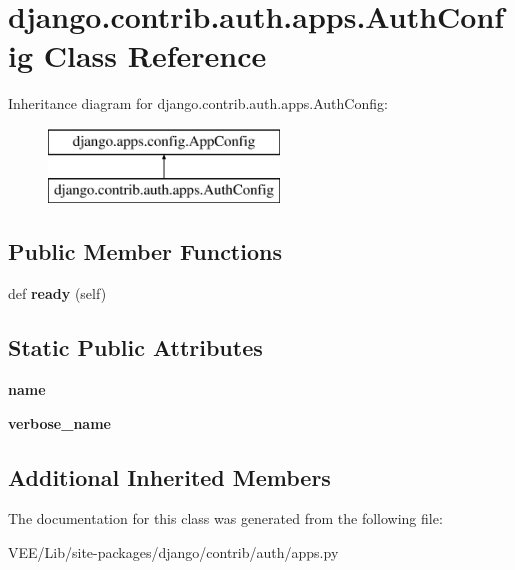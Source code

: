 \hypertarget{classdjango_1_1contrib_1_1auth_1_1apps_1_1_auth_config}{}\section{django.\+contrib.\+auth.\+apps.\+Auth\+Config Class Reference}
\label{classdjango_1_1contrib_1_1auth_1_1apps_1_1_auth_config}
Inheritance diagram for django.\+contrib.\+auth.\+apps.\+Auth\+Config\+:\begin{figure}[H]
\begin{center}
\leavevmode
\includegraphics[height=2.000000cm]{classdjango_1_1contrib_1_1auth_1_1apps_1_1_auth_config}
\end{center}
\end{figure}
\subsection*{Public Member Functions}
\begin{DoxyCompactItemize}
\item 
\mbox{\label{classdjango_1_1contrib_1_1auth_1_1apps_1_1_auth_config_aa6f96886f818aa3dc837d44b2f37cb2c}} 
def {\bfseries ready} (self)
\end{DoxyCompactItemize}
\subsection*{Static Public Attributes}
\begin{DoxyCompactItemize}
\item 
\mbox{\label{classdjango_1_1contrib_1_1auth_1_1apps_1_1_auth_config_a6393351c7ebbd298318ccdf64d80098e}} 
{\bfseries name}
\item 
\mbox{\label{classdjango_1_1contrib_1_1auth_1_1apps_1_1_auth_config_a92455667afc0b8c89b2d7e559333f981}} 
{\bfseries verbose\+\_\+name}
\end{DoxyCompactItemize}
\subsection*{Additional Inherited Members}


The documentation for this class was generated from the following file\+:\begin{DoxyCompactItemize}
\item 
V\+E\+E/\+Lib/site-\/packages/django/contrib/auth/apps.\+py\end{DoxyCompactItemize}
